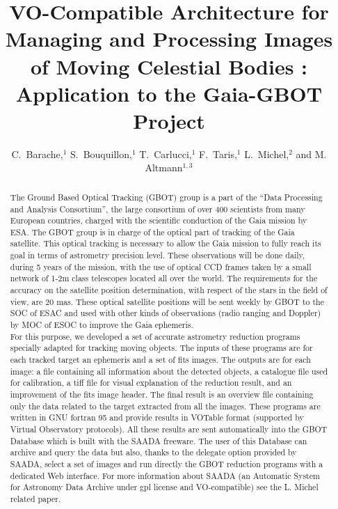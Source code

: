 
\resetcounters




\title{VO-Compatible Architecture for Managing and Processing Images of Moving Celestial Bodies : Application to the Gaia-GBOT Project}
\author{C.~Barache,$^1$ S.~Bouquillon,$^1$ T.~Carlucci,$^1$ F.~Taris,$^1$ L.~Michel,$^2$ and M. Altmann$^{1,3}$
}


\begin{abstract}
The Ground Based Optical Tracking (GBOT) group is a part of the “Data Processing and Analysis Consortium”, the large consortium of over 400 scientists from many European countries, charged with the scientific conduction of the Gaia mission by ESA. The GBOT group is in charge of the optical part of tracking of the Gaia satellite. This optical tracking is necessary to allow the Gaia mission to fully reach its goal in terms of astrometry precision level.  These observations will be done daily, during 5 years of the mission, with the use of optical CCD frames taken by a small network of 1-2m class telescopes located all over the world. The requirements for the accuracy on the satellite position determination, with respect of the stars in the field of view, are 20 mas. 
These optical satellite positions will be sent weekly by GBOT to the SOC of ESAC and used with other kinds of observations (radio ranging and Doppler) by MOC of ESOC to improve the Gaia ephemeris.\\ 
\hspace*{0.5cm}For this purpose, we developed a set of accurate astrometry reduction programs specially adapted for tracking moving objects. The inputs of these programs are for each tracked target an ephemeris and a set of fits images. The outputs are for each image: a file containing all information about the detected objects, a catalogue file used for calibration, a tiff file for visual explanation of the reduction result, and an improvement of the fits image header. The final result is an overview file containing only the data related to the target extracted from all the images. These programs are written in GNU fortran 95 and provide results in VOTable format (supported by Virtual Observatory protocols). All these results are sent automatically into the GBOT Database which is built with the SAADA freeware. The user of this Database can archive and query the data but also, thanks to the delegate option provided by SAADA, select a set of images and run directly the GBOT reduction programs with a dedicated Web interface. For more information about SAADA (an Automatic System for Astronomy Data Archive under gpl license and VO‑compatible) see the L. Michel related paper.
\end{abstract}

